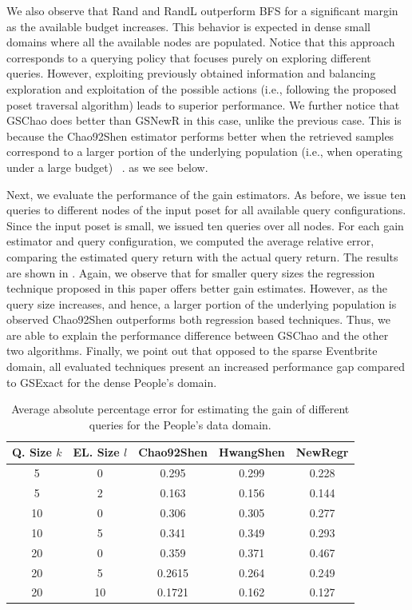 We also observe that Rand and RandL outperform BFS for a significant margin as the available budget increases. This behavior is expected in dense small domains where all the available nodes are populated. Notice that this approach corresponds to a querying policy that focuses purely on exploring different queries. However, exploiting previously obtained information and balancing exploration and exploitation of the possible actions (i.e., following the proposed poset traversal algorithm) leads to superior performance. We further notice that GSChao does better than GSNewR in this case, unlike the previous case. This is because the Chao92Shen estimator performs better when the retrieved samples correspond to a larger portion of the underlying population (i.e., when operating under a large budget) \ifpaper~\cite{crowdgatherfull}. \fi \iftr as we see below. \fi

\iftr
Next, we evaluate the performance of the gain estimators. As before, we issue ten queries to different nodes of the input poset for all available query configurations. Since the input poset is small, we issued ten queries over all nodes. For each gain estimator and query configuration, we computed the average relative error, comparing the estimated query return with the actual query return. The results are shown in . Again, we observe that for smaller query sizes the regression technique proposed in this paper offers better gain estimates. However, as the query size increases, and hence, a larger portion of the underlying population is observed Chao92Shen outperforms both regression based techniques. Thus, we are able to explain the performance difference between GSChao and the other two algorithms. Finally, we point out that opposed to the sparse Eventbrite domain, all evaluated techniques present an increased performance gap compared to GSExact for the dense People's domain.

\begin{table}[h]
\vspace{-5pt}
\scriptsize \center
\caption{Average absolute percentage error for estimating the gain of different queries for the People's data domain.}
\label{tab:peopleesterror}
\begin{tabular}{|c|c|c|c|c|}
\hline
\textbf{Q. Size $k$} & \textbf{EL. Size $l$} & \textbf{Chao92Shen} & \textbf{HwangShen} & \textbf{NewRegr} \\ \hline
5 & 0 & 0.295 & 0.299 & 0.228\\
5 & 2 & 0.163 &  0.156 & 0.144\\
10 & 0 &  0.306 & 0.305 & 0.277\\
10 & 5 &  0.341 & 0.349 & 0.293\\
20 & 0 &  0.359& 0.371 & 0.467 \\
20 & 5 &  0.2615 & 0.264 & 0.249\\
20 & 10 & 0.1721 & 0.162 & 0.127\\
\hline
\end{tabular}
\vspace{-5pt}
\end{table}
\fi

